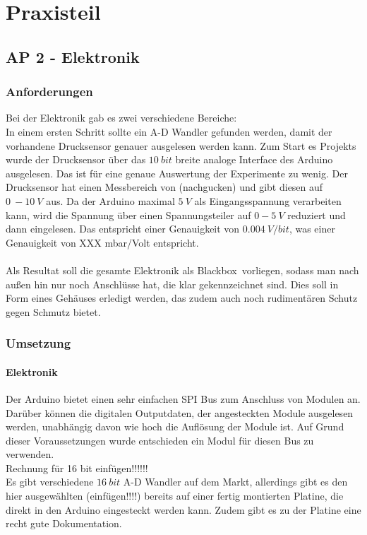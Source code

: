 \chapter{Praxisteil}

\section{AP 2 - Elektronik}

\subsection{Anforderungen}

Bei der Elektronik gab es zwei verschiedene Bereiche: \\
In einem ersten Schritt sollte ein A-D Wandler gefunden werden, damit der vorhandene Drucksensor genauer ausgelesen werden kann. Zum Start es Projekts wurde der Drucksensor über das $\SI{10}{bit}$ breite analoge Interface des Arduino ausgelesen. Das ist für eine genaue Auswertung der Experimente zu wenig. Der Drucksensor hat einen Messbereich von (nachgucken) und gibt diesen auf $\SI{0}{} - \SI{10}{V}$ aus. Da der Arduino maximal $\SI{5}{V}$ als Eingangsspannung verarbeiten kann, wird die Spannung über einen Spannungsteiler auf $\SI{0} - \SI{5}{V}$ reduziert und dann eingelesen. Das entspricht einer Genauigkeit von $\SI{0,004}{V/bit}$, was einer Genauigkeit von XXX mbar/Volt entspricht. \\
\hfill \\
Als Resultat soll die gesamte Elektronik als \glqq Blackbox\grqq \ vorliegen, sodass man nach außen hin nur noch Anschlüsse hat, die klar gekennzeichnet sind. Dies soll in Form eines Gehäuses erledigt werden, das zudem auch noch rudimentären Schutz gegen Schmutz bietet.


\subsection{Umsetzung}

\subsubsection{Elektronik}

Der Arduino bietet einen sehr einfachen SPI Bus zum Anschluss von Modulen an. Darüber können die digitalen Outputdaten, der angesteckten Module ausgelesen werden, unabhängig davon wie hoch die Auflösung der Module ist. Auf Grund dieser Voraussetzungen wurde entschieden ein Modul für diesen Bus zu verwenden. \\
Rechnung für 16 bit einfügen!!!!!! \\
Es gibt verschiedene $\SI{16}{bit}$ A-D Wandler auf dem Markt, allerdings gibt es den hier ausgewählten (einfügen!!!!) bereits auf einer fertig montierten Platine, die direkt in den Arduino eingesteckt werden kann. Zudem gibt es zu der Platine eine recht gute Dokumentation. 


